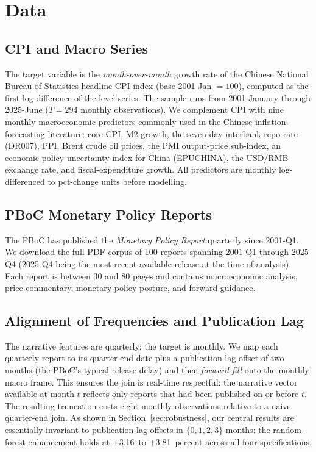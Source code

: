 \documentclass[AER]{AEA}
\begin{document}
\section{Data}\label{sec:data}

\subsection{CPI and Macro Series}
The target variable is the \emph{month-over-month} growth rate of the
Chinese National Bureau of Statistics headline CPI index (base 2001-Jan
$=100$), computed as the first log-difference of the level series. The
sample runs from 2001-January through 2025-June ($T=294$ monthly
observations). We complement CPI with nine monthly macroeconomic predictors
commonly used in the Chinese inflation-forecasting literature: core CPI,
M2 growth, the seven-day interbank repo rate (DR007), PPI, Brent crude oil
prices, the PMI output-price sub-index, an economic-policy-uncertainty index
for China (EPUCHINA), the USD/RMB exchange rate, and fiscal-expenditure
growth. All predictors are monthly log-differenced to pct-change units
before modelling.

\subsection{PBoC Monetary Policy Reports}
The PBoC has published the \emph{Monetary Policy Report} quarterly since
2001-Q1. We download the full PDF corpus of 100 reports spanning 2001-Q1
through 2025-Q4 (2025-Q4 being the most recent available release at the
time of analysis). Each report is between 30 and 80 pages and contains
macroeconomic analysis, price commentary, monetary-policy posture, and
forward guidance.

\subsection{Alignment of Frequencies and Publication Lag}
The narrative features are quarterly; the target is monthly. We map each
quarterly report to its quarter-end date plus a publication-lag offset of
two months (the PBoC's typical release delay) and then \emph{forward-fill}
onto the monthly macro frame. This ensures the join is real-time
respectful: the narrative vector available at month $t$ reflects only
reports that had been published on or before $t$. The resulting truncation
costs eight monthly observations relative to a naive quarter-end join. As
shown in Section~\ref{sec:robustness}, our central results are essentially
invariant to publication-lag offsets in $\{0, 1, 2, 3\}$ months: the
random-forest enhancement holds at +3.16~to +3.81~percent across all four
specifications.
\end{document}
